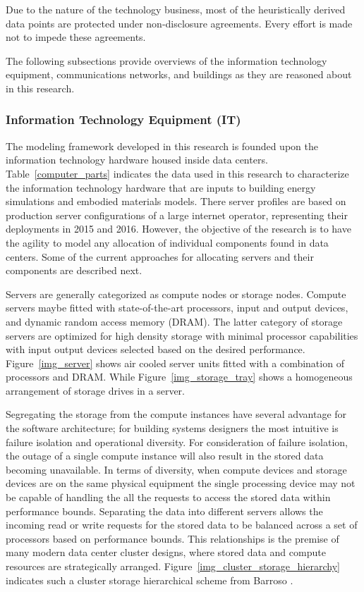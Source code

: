     Due to the nature of the technology business, most of the heuristically derived data points are protected under non-disclosure agreements. Every effort is made not to impede these agreements.
    
    The following subsections provide overviews of the information technology equipment, communications networks, and buildings as they are reasoned about in this research.
    
        \subsubsection{Information Technology Equipment (IT)}
            The modeling framework developed in this research is founded upon the information technology hardware housed inside data centers. Table~\ref{computer_parts} indicates the data used in this research to characterize the information technology hardware that are inputs to building energy simulations and embodied materials models. There server profiles are based on production server configurations of a large internet operator, representing their deployments in 2015 and 2016. However, the objective of the research is to have the agility to model any allocation of individual components found in data centers. Some of the current approaches for allocating servers and their components are described next.
            
            Servers are generally categorized as compute nodes or storage nodes. Compute servers maybe fitted with state-of-the-art processors, input and output devices, and dynamic random access memory (DRAM). The latter category of storage servers are optimized for high density storage with minimal processor capabilities with input output devices selected based on the desired performance. Figure~\ref{img_server} shows air cooled server units fitted with a combination of processors and DRAM. While Figure~\ref{img_storage_tray} shows a homogeneous arrangement of storage drives in a server. 
             
            
            
            Segregating the storage from the compute instances have several advantage for the software architecture; for building systems designers the most intuitive is failure isolation and operational diversity. For consideration of failure isolation, the outage of a single compute instance will also result in the stored data becoming unavailable. In terms of diversity, when compute devices and storage devices are on the same physical equipment the single processing device may not be capable of handling the all the requests to access the stored data within performance bounds. Separating the data into different servers allows the incoming read or write requests for the stored data to be balanced across a set of processors based on performance bounds. This relationships is the premise of many modern data center cluster designs, where stored data and compute resources are strategically arranged. Figure~\ref{img_cluster_storage_hierarchy} indicates such a cluster storage hierarchical scheme from Barroso \cite{barroso18}. 
            
